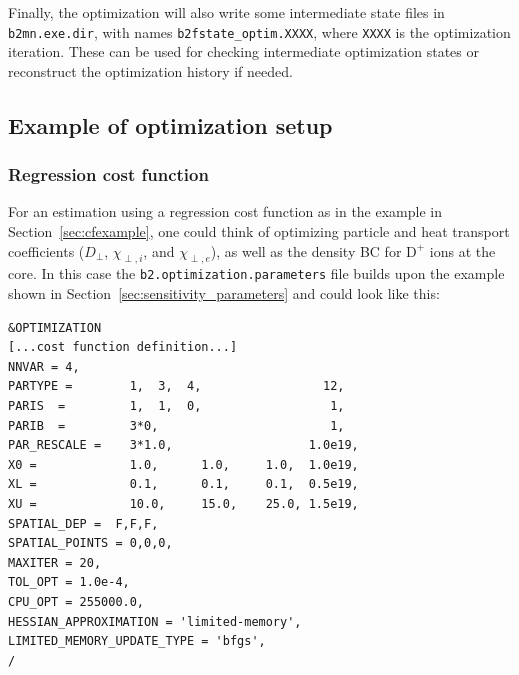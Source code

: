 Finally, the optimization will also write some intermediate state files in {\tt b2mn.exe.dir}, with names {\tt b2fstate\_optim.XXXX}, where {\tt XXXX} is the optimization iteration. These can be used for checking intermediate optimization states or reconstruct the optimization history if needed.

\subsection{Example of optimization setup}\label{sec:example_optimization}

\subsubsection{Regression cost function}

For an estimation using a regression cost function as in the example in Section~\ref{sec:cfexample}, one could think of optimizing particle and heat transport coefficients ($D_{\perp}$, $\chi_{\perp,i}$, and $\chi_{\perp,e}$), as well as the density BC for $\mathrm{D}^{+}$ ions at the core. In this case the {\tt b2.optimization.parameters} file builds upon the example shown in Section~\ref{sec:sensitivity_parameters} and could look like this:
\begin{verbatim}
&OPTIMIZATION
[...cost function definition...]
NNVAR = 4,
PARTYPE =        1,  3,  4,                 12,
PARIS  =         1,  1,  0,                  1,
PARIB  =         3*0,                        1,
PAR_RESCALE =    3*1.0,                   1.0e19,
X0 =             1.0,      1.0,     1.0,  1.0e19,
XL =             0.1,      0.1,     0.1,  0.5e19,
XU =             10.0,     15.0,    25.0, 1.5e19,
SPATIAL_DEP =  F,F,F,
SPATIAL_POINTS = 0,0,0,
MAXITER = 20,
TOL_OPT = 1.0e-4,
CPU_OPT = 255000.0,
HESSIAN_APPROXIMATION = 'limited-memory',
LIMITED_MEMORY_UPDATE_TYPE = 'bfgs',
/
\end{verbatim}

